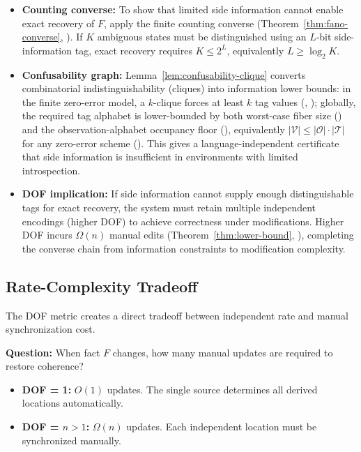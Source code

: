 \begin{itemize}
\item \textbf{Counting converse:} To show that limited side information cannot enable exact recovery of $F$, apply the finite counting converse (Theorem~\ref{thm:fano-converse}, ). If $K$ ambiguous states must be distinguished using an $L$-bit side-information tag, exact recovery requires $K\le 2^L$, equivalently $L\ge \log_2 K$.

\item \textbf{Confusability graph:} Lemma~\ref{lem:confusability-clique} converts combinatorial indistinguishability (cliques) into information lower bounds: in the finite zero-error model, a $k$-clique forces at least $k$ tag values (, ); globally, the required tag alphabet is lower-bounded by both worst-case fiber size () and the observation-alphabet occupancy floor (), equivalently $|\mathcal V|\le |\mathcal O|\cdot |\mathcal T|$ for any zero-error scheme (). This gives a language-independent certificate that side information is insufficient in environments with limited introspection.

\item \textbf{DOF implication:} If side information cannot supply enough distinguishable tags for exact recovery, the system must retain multiple independent encodings (higher DOF) to achieve correctness under modifications. Higher DOF incurs $\Omega(n)$ manual edits (Theorem~\ref{thm:lower-bound}, ), completing the converse chain from information constraints to modification complexity.
\end{itemize}


\subsection{Rate-Complexity Tradeoff}\label{sec:ssot-vs-m}

The DOF metric creates a direct tradeoff between independent rate and manual synchronization cost.

\textbf{Question:} When fact $F$ changes, how many manual updates are required to restore coherence?

\begin{itemize}
\tightlist
\item \textbf{DOF = 1:} $O(1)$ updates. The single source determines all derived locations automatically.
\item \textbf{DOF = $n > 1$:} $\Omega(n)$ updates. Each independent location must be synchronized manually.
\end{itemize}

